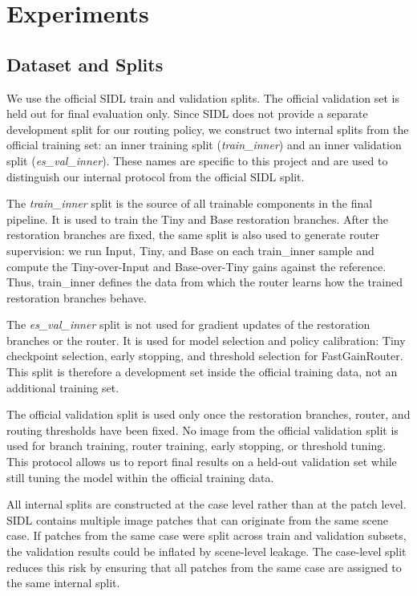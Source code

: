 \documentclass[11pt]{article}
\begin{document}
\section{Experiments}

\subsection{Dataset and Splits}

We use the official SIDL train and validation splits.
The official validation set is held out for final evaluation only.
Since SIDL does not provide a separate development split for our routing policy, we construct two internal splits from the official training set: an inner training split (\textit{train\_inner}) and an inner validation split (\textit{es\_val\_inner}).
These names are specific to this project and are used to distinguish our internal protocol from the official SIDL split.

The \textit{train\_inner} split is the source of all trainable components in the final pipeline.
It is used to train the Tiny and Base restoration branches.
After the restoration branches are fixed, the same split is also used to generate router supervision: we run Input, Tiny, and Base on each train\_inner sample and compute the Tiny-over-Input and Base-over-Tiny gains against the reference.
Thus, train\_inner defines the data from which the router learns how the trained restoration branches behave.

The \textit{es\_val\_inner} split is not used for gradient updates of the restoration branches or the router.
It is used for model selection and policy calibration: Tiny checkpoint selection, early stopping, and threshold selection for FastGainRouter.
This split is therefore a development set inside the official training data, not an additional training set.

The official validation split is used only once the restoration branches, router, and routing thresholds have been fixed.
No image from the official validation split is used for branch training, router training, early stopping, or threshold tuning.
This protocol allows us to report final results on a held-out validation set while still tuning the model within the official training data.

All internal splits are constructed at the case level rather than at the patch level.
SIDL contains multiple image patches that can originate from the same scene case.
If patches from the same case were split across train and validation subsets, the validation results could be inflated by scene-level leakage.
The case-level split reduces this risk by ensuring that all patches from the same case are assigned to the same internal split.
\end{document}
